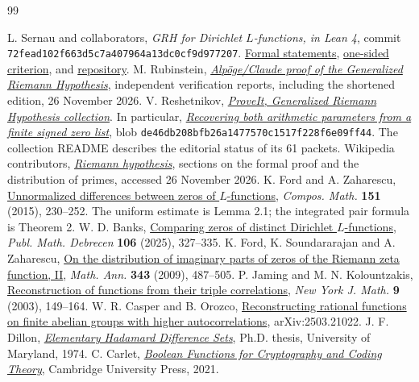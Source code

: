 \documentclass[11pt,letterpaper]{article}
\begin{document}
\newpage
\begin{thebibliography}{99}
\raggedright
{} L. Sernau and collaborators, \emph{GRH for Dirichlet $L$-functions, in Lean 4}, commit \texttt{72fead102f663d5c7a407964a13dc0cf9d977207}. \href{https://github.com/lsernau/grh-lean/blob/72fead102f663d5c7a407964a13dc0cf9d977207/grh/src/Statements.lean}{Formal statements}, \href{https://github.com/lsernau/grh-lean/blob/72fead102f663d5c7a407964a13dc0cf9d977207/grh/src/New/Reduction/Zeros/Criterion.lean}{one-sided criterion}, and \href{https://github.com/lsernau/grh-lean}{repository}.
 M. Rubinstein, \href{https://www.math.uwaterloo.ca/~mrubinst/alpoge_claude_grh/}{\emph{Alp\"oge/Claude proof of the Generalized Riemann Hypothesis}}, independent verification reports, including the shortened edition, 26 November 2026.
 V. Reshetnikov, \href{https://github.com/VladimirReshetnikov/ProveIt/tree/main/Analysis/GeneralizedRiemannHypothesis}{\emph{ProveIt, Generalized Riemann Hypothesis collection}}. In particular, \href{https://github.com/VladimirReshetnikov/ProveIt/blob/main/Analysis/GeneralizedRiemannHypothesis/Research/grh-torsion-and-zero-data/recovery.tex}{\emph{Recovering both arithmetic parameters from a finite signed zero list}}, blob \texttt{de46db208bfb26a1477570c1517f228f6e09ff44}. The collection README describes the editorial status of its 61 packets.
 Wikipedia contributors, \href{https://en.wikipedia.org/wiki/Riemann_hypothesis}{\emph{Riemann hypothesis}}, sections on the formal proof and the distribution of primes, accessed 26 November 2026.
 K. Ford and A. Zaharescu, \href{https://arxiv.org/abs/1305.2520}{Unnormalized differences between zeros of $L$-functions}, \emph{Compos. Math.} \textbf{151} (2015), 230--252. The uniform estimate is Lemma 2.1; the integrated pair formula is Theorem 2.
 W. D. Banks, \href{https://arxiv.org/abs/2302.07073}{Comparing zeros of distinct Dirichlet $L$-functions}, \emph{Publ. Math. Debrecen} \textbf{106} (2025), 327--335.
 K. Ford, K. Soundararajan and A. Zaharescu, \href{https://arxiv.org/abs/0805.2745}{On the distribution of imaginary parts of zeros of the Riemann zeta function, II}, \emph{Math. Ann.} \textbf{343} (2009), 487--505.
 P. Jaming and M. N. Kolountzakis, \href{https://nyjm.albany.edu/j/2003/9-12.pdf}{Reconstruction of functions from their triple correlations}, \emph{New York J. Math.} \textbf{9} (2003), 149--164.
 W. R. Casper and B. Orozco, \href{https://arxiv.org/abs/2503.21022}{Reconstructing rational functions on finite abelian groups with higher autocorrelations}, arXiv:2503.21022.
 J. F. Dillon, \href{https://drum.lib.umd.edu/items/d8150b1f-1bdd-4c3d-9987-c14a95251edc}{\emph{Elementary Hadamard Difference Sets}}, Ph.D. thesis, University of Maryland, 1974.
 C. Carlet, \href{https://www.math.univ-paris13.fr/~carlet/book-fcts-Bool-vect-crypt-codes.pdf}{\emph{Boolean Functions for Cryptography and Coding Theory}}, Cambridge University Press, 2021.
\end{thebibliography}
\end{document}
